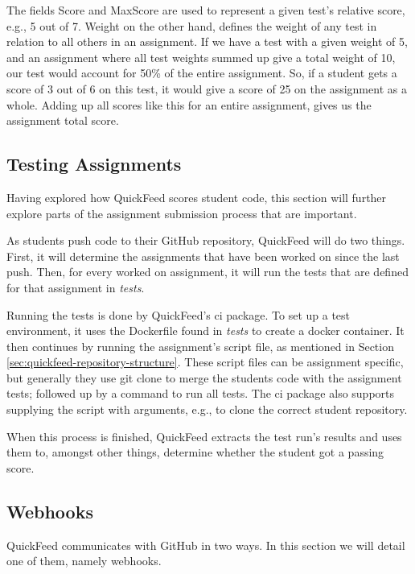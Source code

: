 The fields Score and MaxScore are used to represent a given test's relative score, e.g., 5 out of 7.
Weight on the other hand, defines the weight of any test in relation to all others in an assignment.
If we have a test with a given weight of 5, and an assignment where all test weights summed up give a total weight of 10, our test would account for 50\% of the entire assignment.
So, if a student gets a score of 3 out of 6 on this test, it would give a score of 25 on the assignment as a whole.
Adding up all scores like this for an entire assignment, gives us the assignment total score.

\subsection{Testing Assignments}
\label{sec:testing-assignments}

Having explored how QuickFeed scores student code, this section will further explore parts of the assignment submission process that are important.

As students push code to their GitHub repository, QuickFeed will do two things.
First, it will determine the assignments that have been worked on since the last push.
Then, for every worked on assignment, it will run the tests that are defined for that assignment in \textit{tests}.

Running the tests is done by QuickFeed's ci package.
To set up a test environment, it uses the Dockerfile found in \textit{tests} to create a docker container.
It then continues by running the assignment's script file, as mentioned in Section \ref{sec:quickfeed-repository-structure}.
These script files can be assignment specific, but generally they use git clone to merge the students code with the assignment tests; followed up by a command to run all tests.
The ci package also supports supplying the script with arguments, e.g., to clone the correct student repository.

When this process is finished, QuickFeed extracts the test run's results and uses them to, amongst other things, determine whether the student got a passing score.

\subsection{Webhooks}
\label{sec:webhooks}

QuickFeed communicates with GitHub in two ways.
In this section we will detail one of them, namely webhooks.

